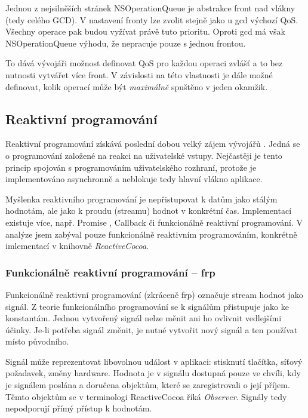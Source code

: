 Jednou z nejsilněších stránek NSOperationQueue je abstrakce front nad vlákny (tedy celého GCD).
V nastavení fronty lze zvolit stejně jako u \acrshort{gcd} výchozí QoS.
Všechny operace pak budou vyžívat právě tuto prioritu.
Oproti \acrshort{gcd} má však NSOperationQueue výhodu, že nepracuje pouze s jednou frontou.

To dává vývojáři možnost definovat QoS pro každou operaci zvlášť a to bez nutnosti vytvářet více front.
V závislosti na této vlastnosti je dále možné definovat, kolik operací může být \textit{maximálně} spuštěno v jeden okamžik.

\subsection{Reaktivní programování}\label{vlakna-rac}

Reaktivní programování získává poslední dobou velký zájem vývojářů \cite{oneagency-rx}.
Jedná se o programování založené na reakci na uživatelské vstupy.
Nejčastěji je tento princip spojován s programováním uživatelského rozhraní, protože je implementováno asynchronně a neblokuje tedy hlavní vlákno aplikace.

Myšlenka reaktivního programování je nepřistupovat k datům jako stálým hodnotám, ale jako k proudu (streamu) hodnot v konkrétní čas.
Implementací existuje více, např. Promise \cite{slaks-promise}, Callback \cite{yld-callback} či funkcionálně reaktivní programování.
V analýze jsem zabýval pouze funkcionálně reaktivním programováním, konkrétně imlementací v knihovně \textit{ReactiveCocoa}.

\subsubsection*{Funkcionálně reaktivní programování -- \acrshort{frp}}

Funkcionálně reaktivní programování (zkráceně \acrshort{frp}) označuje stream hodnot jako signál.
Z teorie funkcionálního programování se k signálům přistupuje jako ke konstantám.
Jednou vytvořený signál nelze měnit ani ho ovlivnit vedlejšími účinky.
Je-li potřeba signál změnit, je nutné vytvořit nový signál a ten používat místo původního.

Signál může reprezentovat libovolnou událost v aplikaci: stisknutí tlačítka, síťový požadavek, změny hardware.
Hodnota je v signálu dostupná pouze ve chvíli, kdy je signálem poslána a doručena objektům, které se zaregistrovali o její příjem.
Těmto objektům se v terminologi ReactiveCocoa říká \textit{Observer}.
Signály tedy nepodporují přímý přístup k hodnotám.

